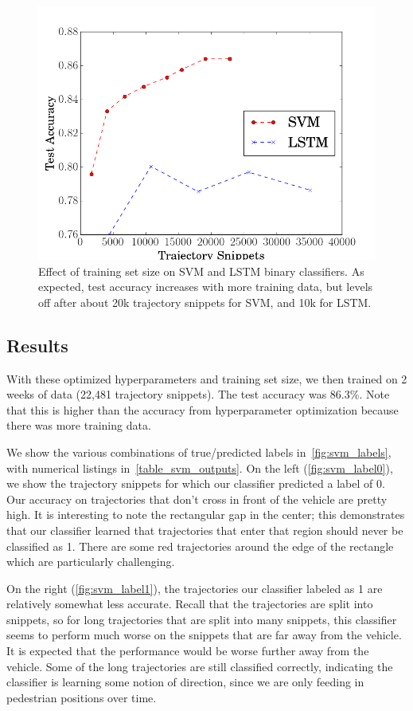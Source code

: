 \begin{figure}
  \centering
  \includegraphics [trim=0 0 0 0, clip, angle=0, width=0.8\columnwidth,
  keepaspectratio]{figures/svm_num_datapts}
  \caption{Effect of training set size on SVM and LSTM binary classifiers. As expected, test accuracy increases with more training data, but levels off after about 20k trajectory snippets for SVM, and 10k for LSTM.} 
  \label{fig:svm_num_datapts} 
\end{figure}


\subsection{Results}
With these optimized hyperparameters and training set size, we then trained on 2 weeks of data (22,481 trajectory snippets).
The test accuracy was 86.3\%.
Note that this is higher than the accuracy from hyperparameter optimization because there was more training data.

We show the various combinations of true/predicted labels in~\cref{fig:svm_labels}, with numerical listings in~\cref{table_svm_outputs}.
On the left (\cref{fig:svm_label0}), we show the trajectory snippets for which our classifier predicted a label of 0.
Our accuracy on trajectories that don't cross in front of the vehicle are pretty high.
It is interesting to note the rectangular gap in the center; this demonstrates that our classifier learned that trajectories that enter that region should never be classified as 1.
There are some red trajectories around the edge of the rectangle which are particularly challenging. 

On the right (\cref{fig:svm_label1}), the trajectories our classifier labeled as 1 are relatively somewhat less accurate.
Recall that the trajectories are split into snippets, so for long trajectories that are split into many snippets, this classifier seems to perform much worse on the snippets that are far away from the vehicle.
It is expected that the performance would be worse further away from the vehicle.
Some of the long trajectories are still classified correctly, indicating the classifier is learning some notion of direction, since we are only feeding in pedestrian positions over time.

